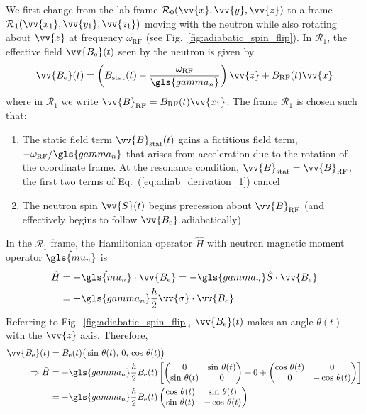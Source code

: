 We first change from the lab frame $\mathcal{R}_0(\vv{x},\vv{y}, \vv{z})$ to a frame $\mathcal{R}_1(\vv{x_1},\vv{y_1}, \vv{z_1})$ moving with the neutron while also rotating about $\vv{z}$ at frequency $\omega_\text{RF}$ (see Fig.~\ref{fig:adiabatic_spin_flip}). In $\mathcal{R}_1$, the effective field $\vv{B_\text{e}}(t)$ seen by the neutron is given by
%
\begin{gather}
    \vv{B_\text{e}}(t)=\left(B_\text{stat}(t)-\frac{\omega_\text{RF}}{\gls{gamma_n}}\right)\vv{z}+B_\text{RF}(t)\vv{x} \label{eq:adiab_derivation_1}
\end{gather}
%
where in $\mathcal{R}_1$ we write $\vv{B}_\text{RF}=B_\text{RF}(t)\vv{x_1}$. The frame $\mathcal{R}_1$ is chosen such that:
%
\begin{enumerate}
    \item The static field term $\vv{B}_\text{stat}(t)$ gains a fictitious field term, $-\omega_\text{RF}/\gls{gamma_n}$ that arises from acceleration due to the rotation of the coordinate frame. At the resonance condition, $\vv{B}_\text{stat} = \vv{B}_\text{RF}$, the first two terms of Eq.~(\ref{eq:adiab_derivation_1}) cancel
    \item The neutron spin $\vv{S}(t)$ begins precession about $\vv{B}_\text{RF}$ (and effectively begins to follow $\vv{B_\text{e}}$ adiabatically)
\end{enumerate}
%
In the $\mathcal{R}_1$ frame, the Hamiltonian operator $\hat{H}$ with neutron magnetic moment operator $\hat{\gls{mu_n}}$ is
%
\begin{align}
    \hat{H} &= -\hat{\gls{mu_n}}\cdot\vv{B_{e}}=-\gls{gamma_n}\hat{S}\cdot\vv{B_{e}} \nonumber \\
    &= -\gls{gamma_n}\frac{\hbar}{2}\vv{\sigma}\cdot\vv{B_{e}}
\end{align}
%
Referring to Fig.~\ref{fig:adiabatic_spin_flip}, $\vv{B_\text{e}}(t)$ makes an angle $\theta(t)$ with the $\vv{z}$ axis. Therefore,
%
\begin{align}
    \vv{B_\text{e}}(t) &= B_\text{e}(t)\big(\sin\,\theta(t),\,0,\,\cos\,\theta(t) \big) \\
    \Rightarrow \hat{H} &= -\gls{gamma_n}\frac{\hbar}{2}B_\text{e}(t)\left[\left(\begin{matrix}
                0 & \sin \, \theta(t)\\
                \sin \, \theta(t) & 0
                \end{matrix}\right)+0+\left(\begin{matrix}
                \cos \, \theta(t) & 0\\
                0 & -\cos \, \theta(t)
                \end{matrix}\right)\right] \nonumber \\
    &= -\gls{gamma_n} \frac{\hbar}{2}B_\text{e}(t)\left(\begin{matrix}
                \cos \, \theta(t) & \sin \, \theta(t)\\
                \sin \, \theta(t) & -\cos \, \theta(t)
                \end{matrix}\right) \label{eq:adiab_derivation_2}
\end{align}
